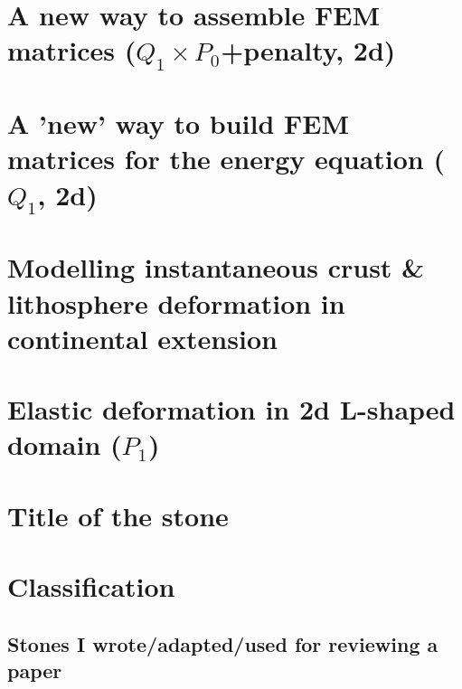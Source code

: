 \documentclass[a4paper,11pt]{report}
\begin{document}
\chapter{A new way to assemble FEM matrices ($Q_1\times P_0$+penalty, 2d) \label{f176}} %

\chapter{A 'new' way to build FEM matrices for the energy equation ($Q_1$, 2d) \label{f177}} %

\chapter{Modelling instantaneous crust \& lithosphere deformation in continental extension \label{f178}} %

\chapter{Elastic deformation in 2d L-shaped domain ($P_1$) \label{f178}} %






\chapter{Title of the stone}

\appendix
\chapter{Classification}

\section{
Stones I wrote/adapted/used for reviewing a paper}
\end{document}
